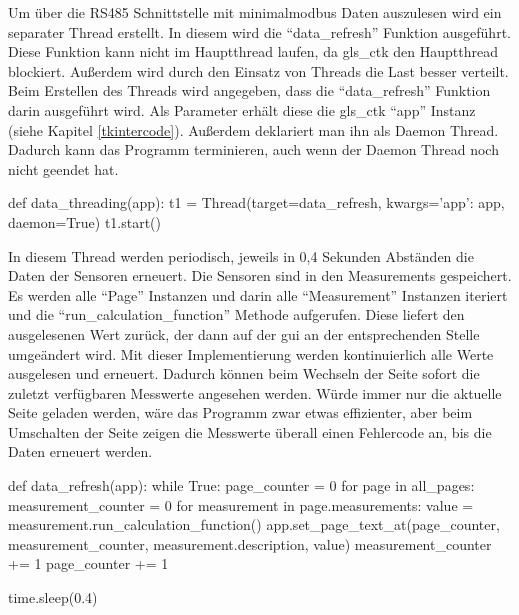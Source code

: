 \label{auslesen_rlt_parameter}

Um über die RS485 Schnittstelle mit minimalmodbus Daten auszulesen wird ein separater Thread erstellt. In diesem wird die \enquote{data\_refresh} Funktion ausgeführt. Diese Funktion kann nicht im Hauptthread laufen, da \gls{gls_ctk} den Hauptthread blockiert. Außerdem wird durch den Einsatz von Threads die Last besser verteilt. Beim Erstellen des Threads wird angegeben, dass die \enquote{data\_refresh} Funktion darin ausgeführt wird. Als Parameter erhält diese die \gls{gls_ctk} \enquote{app} Instanz (siehe Kapitel  \ref{tkintercode}). Außerdem deklariert man ihn als Daemon Thread. Dadurch kann das Programm terminieren, auch wenn der Daemon Thread noch nicht geendet hat.

\begin{pythoncode}
def data_threading(app):
	t1 = Thread(target=data_refresh, kwargs={'app': app}, daemon=True)
	t1.start()
\end{pythoncode}

In diesem Thread werden periodisch, jeweils in 0,4 Sekunden Abständen die Daten der Sensoren erneuert. Die Sensoren sind in den Measurements gespeichert. Es werden alle \enquote{Page} Instanzen und darin alle \enquote{Measurement} Instanzen iteriert und die \enquote{run\_calculation\_function} Methode aufgerufen. Diese liefert den ausgelesenen Wert zurück, der dann auf der \acs{gui} an der entsprechenden Stelle umgeändert wird. \newline Mit dieser Implementierung werden kontinuierlich alle Werte ausgelesen und erneuert. Dadurch können beim Wechseln der Seite sofort die zuletzt verfügbaren Messwerte angesehen werden. Würde immer nur die aktuelle Seite geladen werden, wäre das Programm zwar etwas effizienter, aber beim Umschalten der Seite zeigen die Messwerte überall einen Fehlercode an, bis die Daten erneuert werden. 

\begin{pythoncode}
def data_refresh(app):
	while True:
		page_counter = 0
		for page in all_pages:
			measurement_counter = 0
			for measurement in page.measurements:
				value = measurement.run_calculation_function()
				app.set_page_text_at(page_counter, measurement_counter, measurement.description, value)
				measurement_counter += 1
			page_counter += 1
		
		time.sleep(0.4)
\end{pythoncode}

